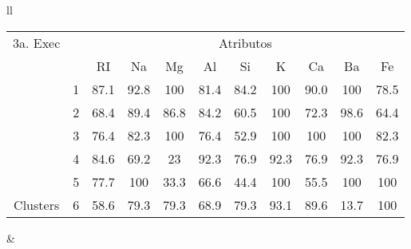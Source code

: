 \begin{table}[!ht]
\begin{tabular}{ll}
   \small\addtolength{\tabcolsep}{-5pt}
     \begin{tabular}{|cl|c|c|c|c|c|c|c|c|c|}
        \hline \hline
            {\tiny 3a. Exec}     &   & \multicolumn{9}{c|}{\tiny Atributos}                                               \\ \cline{3-11} 
       \multicolumn{1}{|l}{}                            &   & RI    & Na    & Mg  & Al   & Si   & K   & Ca   & Ba  & Fe             \\ \hline
        \multicolumn{1}{|c|}{}                           & 1 & 87.1 & 92.8  & 100 & 81.4 & 84.2 & 100 & 90.0 & 100 & 78.5 \\ \cline{2-11} 
        \multicolumn{1}{|c|}{}                           & 2 & 68.4 & 89.4  & 86.8& 84.2 & 60.5 & 100  & 72.3 &98.6 & 64.4  \\ \cline{2-11} 
        \multicolumn{1}{|c|}{}                           & 3 & 76.4   & 82.3& 100  & 76.4 & 52.9 & 100  & 100 & 100 & 82.3  \\ \cline{2-11}
        \multicolumn{1}{|c|}{}                           & 4 & 84.6   & 69.2& 23  & 92.3 & 76.9 & 92.3  & 76.9 & 92.3 & 76.9  \\ \cline{2-11}
        \multicolumn{1}{|c|}{}                           & 5 & 77.7   & 100& 33.3  & 66.6 & 44.4 & 100  & 55.5 & 100 & 100  \\ \cline{2-11}
        \multicolumn{1}{|c|}{\multirow{-3}{*}{\tiny Clusters}} & 6 & 58.6 & 79.3& 79.3  & 68.9 & 79.3 & 93.1  & 89.6 & 13.7 & 100   \\ 
        
        \hline
      \end{tabular}
    
    &
    

\end{tabular}
\end{table}
